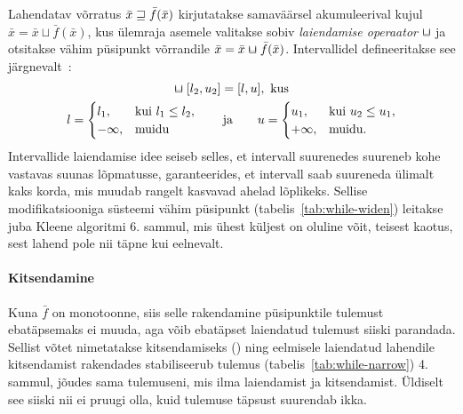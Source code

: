 \documentclass[../thesis.tex]{subfiles}
\begin{document}
Lahendatav võrratus $\bar{x} \sqsupseteq \bar{f}(\bar{x})$ kirjutatakse samaväärsel akumuleerival kujul $\bar{x} = \bar{x} \sqcup \bar{f}(\bar{x})$, kus ülemraja asemele valitakse sobiv \emph{laiendamise operaator} $\widen$ ja otsitakse vähim püsipunkt võrrandile $\bar{x} = \bar{x} \widen \bar{f}(\bar{x})$. Intervallidel defineeritakse see järgnevalt~\cite[62]{seidl_foundations}:
\begin{gather*}
	[l_1, u_1] \widen [l_2, u_2] = [l, u], \text{ kus} \\
	l = \begin{cases}
		l_1, & \text{kui } l_1 \leq l_2, \\
		-\infty, & \text{muidu}
	\end{cases}
	\qquad \text{ja} \qquad
	u = \begin{cases}
		u_1, & \text{kui } u_2 \leq u_1, \\
		+\infty, & \text{muidu}.
	\end{cases}
\end{gather*}
Intervallide laiendamise idee seiseb selles, et intervall suurenedes suureneb kohe vastavas suunas lõpmatusse, garanteerides, et intervall saab suureneda ülimalt kaks korda, mis muudab rangelt kasvavad ahelad lõplikeks. Sellise modifikatsiooniga süsteemi vähim püsipunkt (tabelis~\ref{tab:while-widen}) leitakse juba Kleene algoritmi 6. sammul, mis ühest küljest on oluline võit, teisest kaotus, sest lahend pole nii täpne kui eelnevalt.

\paragraph{Kitsendamine}
Kuna $\bar{f}$ on monotoonne, siis selle rakendamine püsipunktile tulemust ebatäpsemaks ei muuda, aga võib ebatäpset laiendatud tulemust siiski parandada. Sellist võtet nimetatakse kitsendamiseks () ning eelmisele laiendatud lahendile kitsendamist rakendades stabiliseerub tulemus (tabelis~\ref{tab:while-narrow}) 4. sammul, jõudes sama tulemuseni, mis ilma laiendamist ja kitsendamist. Üldiselt see siiski nii ei pruugi olla, kuid tulemuse täpsust suurendab ikka.
\end{document}
